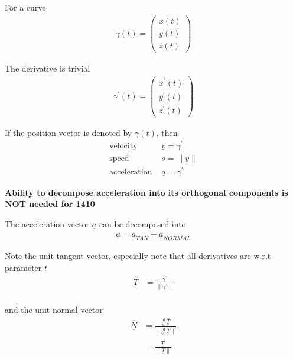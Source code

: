 \begin{framed}
   For a curve 
   \begin{align*}
     \gamma (t) = \begin{pmatrix} 
       x(t) \\ y(t) \\ z(t)  
     \end{pmatrix}
   \end{align*}

   The derivative is trivial
   \begin{align*}
     \gamma ^{\prime} (t) = \begin{pmatrix} 
       x ^{\prime}(t) \\ y ^{\prime}(t) \\ z ^{\prime}(t)  
     \end{pmatrix}
   \end{align*}

   If the position vector is denoted by $ \gamma(t)$, then 
    \begin{align*}
       \text{velocity }& \underline{v} = \gamma ^{\prime} \\
       \text{speed }& s = \lVert \underline{v} \rVert  \\
       \text{acceleration }& \underline{a} = \gamma ^{\prime\prime}
   \end{align*}

   \textbf{Ability to decompose acceleration into its orthogonal components is NOT needed for 1410}
   
   The acceleration vector $ \underline{a}$ can be decomposed into
   \begin{align*}
      \underline{a} = \underline{a}_{TAN} + \underline{a}_{NORMAL}
   \end{align*}

   Note the unit tangent vector, especially note that all derivatives are w.r.t parameter $t$
   \begin{align*}
      \hat{\underline{T}} &= \frac{\gamma ^{\prime}}{ \lVert \gamma ^{\prime} \rVert } \\
   \end{align*}

   and the unit normal vector
   \begin{align*}
      \hat{\underline{N}} &= \frac{ \frac{d}{dt} \hat{ \underline{T}}}{ \lVert \frac{d}{dt} \hat{ \underline{T} }\rVert } \\
                          &= \frac{ \underline{T} ^{\prime}}{ \lVert \underline{T} \rVert }
   \end{align*}
\end{framed}


